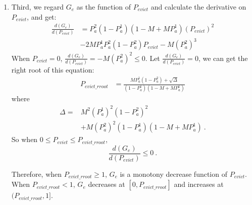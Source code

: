 \begin{enumerate}
\item
 Third, we regard $G_e$ as the function of $P_{evict}$ and calculate the derivative on $P_{evict}$, and get:
\begin{equation*}
\begin{split}
\frac{d(G_e)}{d(P_{evict})} &= P_{a}^{\mathfrak{2}}(1-P_{a}^{\mathfrak{1}})(1-M+MP_{a}^{\mathfrak{1}})(P_{evict})^2\\
&-2MP_{a}^{\mathfrak{1}}P_{a}^{\mathfrak{2}}(1-P_{a}^{\mathfrak{2}})P_{evict}-M(P_{a}^{\mathfrak{2}})^3
\end{split}
\end{equation*}
When $P_{evict} = 0$, $\frac{d(G_e)}{d(P_{evict})} = -M(P_{a}^{\mathfrak{2}})^2 \leq 0 $.
Let $\frac{d(G_e)}{d(P_{evict})} = 0$, we can get the right root of this equation:
\begin{equation}
\begin{split}
P_{evict\_rroot} &= \frac{MP_{a}^{\mathfrak{1}}(1-P_{a}^{\mathfrak{2}})+\sqrt{\Delta}}{(1-P_{a}^{\mathfrak{1}})(1-M+MP_{a}^{\mathfrak{1}})}
\end{split}
\end{equation}
where
\begin{align}
\Delta = &M^{2}(P_{a}^{\mathfrak{1}})^{2}(1-P_{a}^{\mathfrak{2}})^2 \nonumber \\
&+ M(P_{a}^{\mathfrak{2}})^{2}(1-P_{a}^\mathfrak{1})(1-M+MP_{a}^{\mathfrak{1}})\  .\nonumber
\end{align}
So when
$
0 \leq P_{evict} \leq P_{evict\_rroot}
$,
$$\frac{d(G_e)}{d(P_{evict})} \leq 0\ .$$

Therefore, when $P_{evict\_rroot} \geq 1$, $G_e$ is a monotony decrease function of $P_{evict}$.
When $P_{evict\_rroot} < 1$, $G_e$ decreases at $[0,P_{evict\_rroot}]$ and increases at $(P_{evict\_rroot},1]$.


\end{enumerate}
